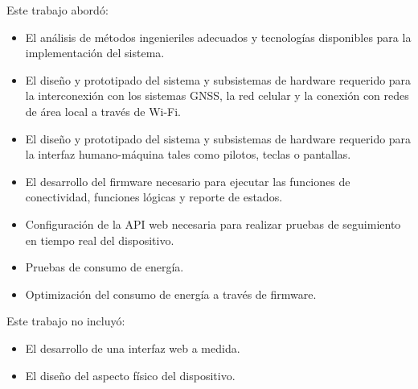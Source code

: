 Este trabajo abordó:
\begin{itemize}
    \item El análisis de métodos ingenieriles adecuados y tecnologías disponibles para la implementación del sistema.
    \item El diseño y prototipado del sistema y subsistemas de hardware requerido para la interconexión con los sistemas GNSS, la red celular y la conexión con redes de área local a través de Wi-Fi. 
    \item El diseño y prototipado del sistema y subsistemas de hardware requerido para la interfaz humano-máquina tales como pilotos, teclas o pantallas. 
    \item El desarrollo del firmware necesario para ejecutar las funciones de conectividad, funciones lógicas y reporte de estados.
    \item Configuración de la API web necesaria para realizar pruebas de seguimiento en tiempo real del dispositivo. 
    \item Pruebas de consumo de energía. 
    \item Optimización del consumo de energía a través de firmware.
\end{itemize}

Este trabajo no incluyó:

\begin{itemize}
    \item El desarrollo de una interfaz web a medida.
    \item El diseño del aspecto físico del dispositivo. 
\end{itemize}



